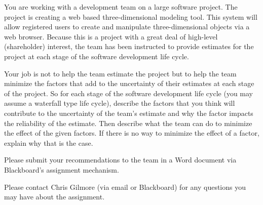 \documentclass[11pt]{article}
\begin{document}
You are working with a development team on a large software project.  The project is creating a web
based three-dimensional modeling tool.  This system will allow registered users to create and
manipulate three-dimensional objects via a web browser.  Because this is a project with a great deal
of high-level (shareholder) interest, the team has been instructed to provide estimates for the
project at each stage of the software development life cycle.

Your job is not to help the team estimate the project but to help the team minimize the factors that
add to the uncertainty of their estimates at each stage of the project.  So for each stage of the
software development life cycle (you may assume a waterfall type life cycle), describe the factors
that you think will contribute to the uncertainty of the team’s estimate and why the factor impacts
the reliability of the estimate.  Then describe what the team can do to minimize the effect of the
given factors.  If there is no way to minimize the effect of a factor, explain why that is the case.

Please submit your recommendations to the team in a Word document via Blackboard’s assignment
mechanism.

Please contact Chris Gilmore (via email or Blackboard) for any questions you may have about the
assignment.
\end{document}
